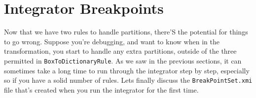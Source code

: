 \newpage
\hypertarget{sec:breakpoints}{}
\section{Integrator Breakpoints}
\genHeader

Now that we have two rules to handle partitions, there'S the potential for things to go wrong. Suppose you're debugging, and want to know when in the
transformation, you start to handle any extra partitions, outside of the three permitted in \texttt{BoxToDictionaryRule}. As we saw in the previous sections, it
can sometimes take a long time to run through the integrator step by step, especially so if you have a solid number of rules.  Lets finally discuss the
\texttt{BreakPointSet.xmi} file that's created when you run the integrator for the first time.

